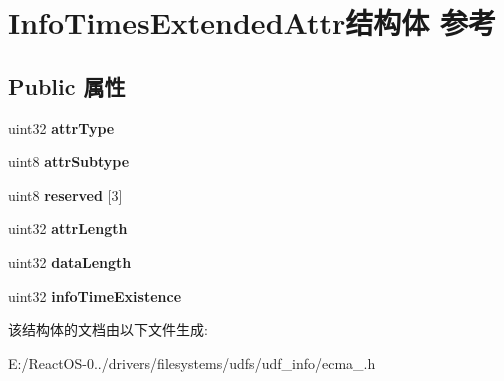 \hypertarget{struct_info_times_extended_attr}{}\section{Info\+Times\+Extended\+Attr结构体 参考}
\label{struct_info_times_extended_attr}
\subsection*{Public 属性}
\begin{DoxyCompactItemize}
\item 
\mbox{\label{struct_info_times_extended_attr_aed2fee501309e7c02d7ae31b9e095ffb}} 
uint32 {\bfseries attr\+Type}
\item 
\mbox{\label{struct_info_times_extended_attr_ae43e1593cab9c2b978f1a34c5ac1841d}} 
uint8 {\bfseries attr\+Subtype}
\item 
\mbox{\label{struct_info_times_extended_attr_a28e0c078ab53a5942fc681c2823e74b6}} 
uint8 {\bfseries reserved} \mbox{[}3\mbox{]}
\item 
\mbox{\label{struct_info_times_extended_attr_ac9da65d2da55a48774a4cff1de8b05b8}} 
uint32 {\bfseries attr\+Length}
\item 
\mbox{\label{struct_info_times_extended_attr_afd754d20f503b7088f70d3775a6d588a}} 
uint32 {\bfseries data\+Length}
\item 
\mbox{\label{struct_info_times_extended_attr_a4468d4506e8dcb762a289a2d4bf99b21}} 
uint32 {\bfseries info\+Time\+Existence}
\end{DoxyCompactItemize}


该结构体的文档由以下文件生成\+:\begin{DoxyCompactItemize}
\item 
E\+:/\+React\+O\+S-\/0../drivers/filesystems/udfs/udf\+\_\+info/ecma\+\_.\+h\end{DoxyCompactItemize}
